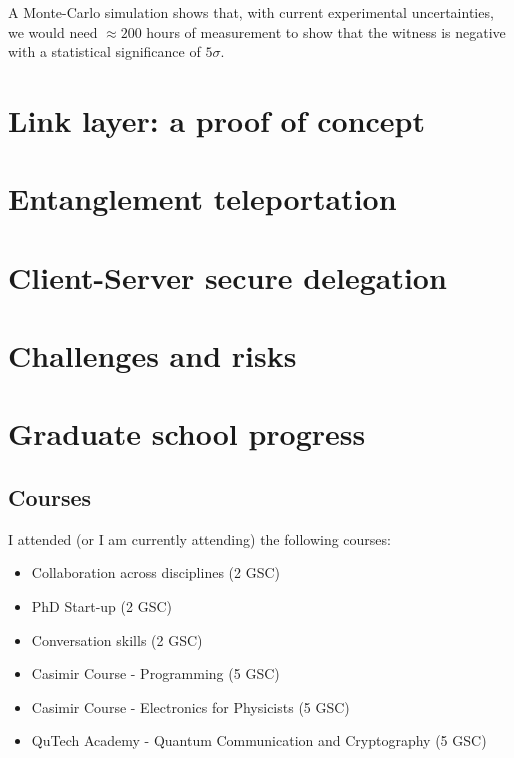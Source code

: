 \documentclass[a4paper, twoside]{article}
\begin{document}
A Monte-Carlo simulation shows that, with current experimental uncertainties, we would need $\approx 200$ hours of measurement to show that the witness is negative with a statistical significance of $5\sigma$.

\section{Link layer: a proof of concept}

\section{Entanglement teleportation}

\section{Client-Server secure delegation}

\section{Challenges and risks}

\section{Graduate school progress}
\subsection{Courses}
I attended (or I am currently attending) the following courses:
\begin{itemize}
	\item Collaboration across disciplines (2 GSC) 
	\item PhD Start-up (2 GSC)
	\item Conversation skills (2 GSC)
	\item Casimir Course - Programming (5 GSC)
	\item Casimir Course - Electronics for Physicists (5 GSC)
	\item QuTech Academy - Quantum Communication and Cryptography (5 GSC)
\end{itemize}
\end{document}
